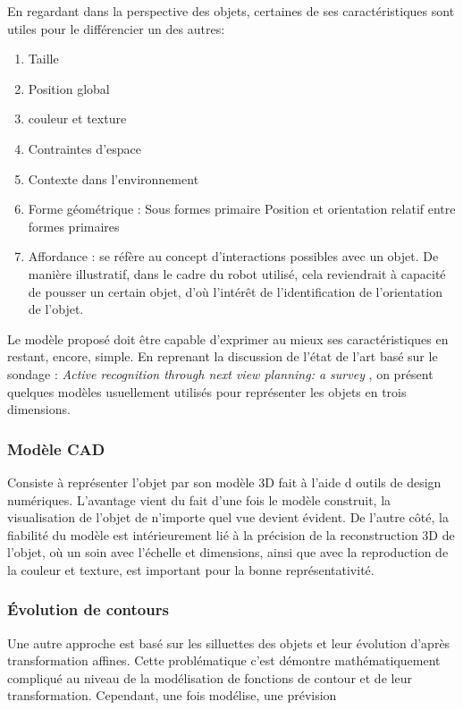 {  En regardant dans la perspective des objets, certaines de ses caractéristiques sont utiles pour le différencier un des autres:

  \begin {enumerate}
  \item Taille
  \item Position global
  \item couleur et texture
  \item Contraintes d’espace
  \item Contexte dans l'environnement
  \item Forme géométrique : 
    \subitem Sous formes primaire 
    \subitem Position et orientation relatif entre formes primaires
  \item Affordance : se réfère au concept d’interactions possibles
    avec un objet. De manière illustratif, dans le cadre du robot utilisé,
    cela reviendrait à capacité de pousser un certain objet, d’où
    l’intérêt de l’identification de l’orientation de l’objet.
  \end{enumerate} 
}

Le modèle proposé doit être capable d'exprimer au
mieux ses caractéristiques en restant, encore, simple.  En reprenant la
discussion de l'état de l'art basé sur le sondage : 
\textit{Active recognition through next view planning: a survey}
, on présent quelques modèles usuellement
utilisés pour représenter les objets en trois dimensions.

\subsubsection{Modèle CAD}

Consiste à représenter l'objet par son modèle 3D fait à l'aide d
outils de design numériques. L'avantage vient du fait d'une fois le
modèle construit, la visualisation de l'objet de n'importe quel vue
devient évident. De l'autre côté, la fiabilité du modèle est
intérieurement lié à la précision de la reconstruction 3D de l'objet,
où un soin avec l'échelle et dimensions, ainsi que avec la
reproduction de la couleur et texture, est important pour la bonne
représentativité.

\subsubsection{Évolution de contours}

Une autre approche est basé sur les silluettes des objets et leur
évolution d'après transformation affines. Cette problématique c'est
démontre mathématiquement compliqué au niveau de la modélisation de
fonctions de contour et de leur transformation. Cependant, une fois
modélise, une prévision

